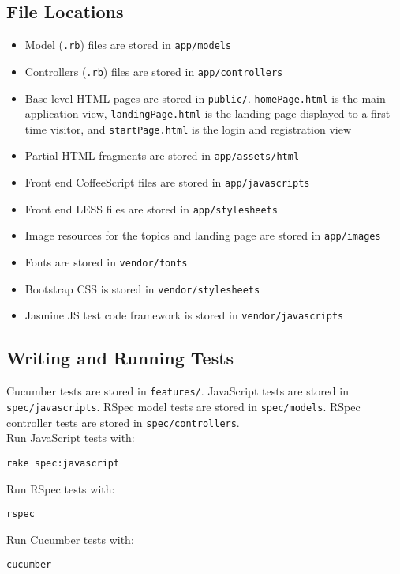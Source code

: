 \documentclass[12pt]{article}
\begin{document}
\subsection{File Locations}
\begin{itemize}
    \item Model (\texttt{.rb}) files are stored in \texttt{app/models}
    \item Controllers (\texttt{.rb}) files are stored in \texttt{app/controllers}
    \item Base level HTML pages are stored in \texttt{public/}.
        \texttt{homePage.html} is the main application view, \texttt{landingPage.html} is the
        landing page displayed to a first-time visitor, and
        \texttt{startPage.html} is the login and registration view
    \item Partial HTML fragments are stored in \texttt{app/assets/html}
    \item Front end CoffeeScript files are stored in \texttt{app/javascripts}
    \item Front end LESS files are stored in \texttt{app/stylesheets}
    \item Image resources for the topics and landing page are stored in \texttt{app/images}
    \item Fonts are stored in \texttt{vendor/fonts}
    \item Bootstrap CSS is stored in \texttt{vendor/stylesheets}
    \item Jasmine JS test code framework is stored in \texttt{vendor/javascripts}
\end{itemize}

\subsection{Writing and Running Tests}
Cucumber tests are stored in \texttt{features/}.  JavaScript tests are stored
in \texttt{spec/javascripts}. RSpec model tests are stored in
\texttt{spec/models}.  RSpec controller tests are stored in
\texttt{spec/controllers}.\\

Run JavaScript tests with:
\begin{verbatim}
rake spec:javascript
\end{verbatim}

Run RSpec tests with:
\begin{verbatim}
rspec
\end{verbatim}

Run Cucumber tests with:
\begin{verbatim}
cucumber
\end{verbatim}
\end{document}
